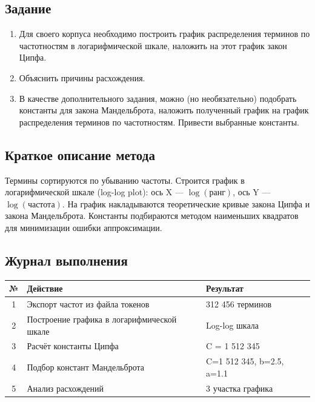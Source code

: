 \documentclass[a4paper, 12pt]{article}
\begin{document}
\subsection*{Задание}
\begin{enumerate}
    \item Для своего корпуса необходимо построить график распределения терминов по частотностям в логарифмической шкале, наложить на этот график закон Ципфа.
    \item Объяснить причины расхождения.
    \item В качестве дополнительного задания, можно (но необязательно) подобрать константы для закона Мандельброта, наложить полученный график на график распределения терминов по частотностям. Привести выбранные константы.
\end{enumerate}

\subsection*{Краткое описание метода}
Термины сортируются по убыванию частоты. Строится график в логарифмической шкале (log-log plot): ось X — $\log(\text{ранг})$, ось Y — $\log(\text{частота})$. На график накладываются теоретические кривые закона Ципфа и закона Мандельброта. Константы подбираются методом наименьших квадратов для минимизации ошибки аппроксимации.

\subsection*{Журнал выполнения}
\begin{table}[h]
\centering
\begin{tabular}{|c|l|l|}
\hline
\textbf{№} & \textbf{Действие} & \textbf{Результат} \\ \hline
1 & Экспорт частот из файла токенов & 312 456 терминов \\ \hline
2 & Построение графика в логарифмической шкале & Log-log шкала \\ \hline
3 & Расчёт константы Ципфа & C = 1 512 345 \\ \hline
4 & Подбор констант Мандельброта & C=1 512 345, b=2.5, a=1.1 \\ \hline
5 & Анализ расхождений & 3 участка графика \\ \hline
\end{tabular}
\end{table}
\end{document}
